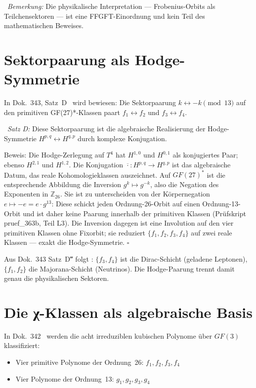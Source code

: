 \SM\ \textit{Bemerkung:} Die physikalische Interpretation — Frobenius-Orbits
als Teilchensektoren — ist eine FFGFT-Einordnung und kein Teil des
mathematischen Beweises.

\section{Sektorpaarung als Hodge-Symmetrie}

In Dok.~343, Satz~D \BM\ wird bewiesen: Die Sektorpaarung
$k \leftrightarrow -k \pmod{13}$ auf den primitiven GF(27)*-Klassen paart
$f_1 \leftrightarrow f_2$ und $f_3 \leftrightarrow f_4$.

\BM\ \textit{Satz D:} Diese Sektorpaarung ist die algebraische Realisierung
der Hodge-Symmetrie $H^{p,q} \leftrightarrow H^{q,p}$ durch komplexe
Konjugation.

Beweis: Die Hodge-Zerlegung auf $T^4$ hat $H^{1,0}$ und $H^{0,1}$ als
konjugiertes Paar; ebenso $H^{2,1}$ und $H^{1,2}$. Die Konjugation
$\overline{\cdot}: H^{p,q} \to H^{q,p}$ ist das algebraische Datum, das
reale Kohomologieklassen auszeichnet. Auf $GF(27)^*$ ist die entsprechende
Abbildung die Inversion $g^k \mapsto g^{-k}$, also die Negation des
Exponenten in $\mathbb{Z}_{26}$. Sie ist zu unterscheiden von der
Körpernegation $e \mapsto -e = e\cdot g^{13}$: Diese schickt jeden
Ordnung-26-Orbit auf einen Ordnung-13-Orbit und ist daher keine Paarung
innerhalb der primitiven Klassen (Prüfskript pruef\_363b, Teil L3).
Die Inversion dagegen ist eine Involution auf den vier primitiven
Klassen ohne Fixorbit; sie reduziert $\{f_1,f_2,f_3,f_4\}$ auf zwei
reale Klassen — exakt die Hodge-Symmetrie. \hfill$\square$

Aus Dok.~343 Satz~D‴ folgt \BM: $\{f_3,f_4\}$ ist die Dirac-Schicht
(geladene Leptonen), $\{f_1,f_2\}$ die Majorana-Schicht (Neutrinos). Die
Hodge-Paarung trennt damit genau die physikalischen Sektoren.

\section{Die χ-Klassen als algebraische Basis}

In Dok.~342 \BM\ werden die acht irreduziblen kubischen Polynome über
$GF(3)$ klassifiziert:
\begin{itemize}
\item Vier primitive Polynome der Ordnung~26: $f_1, f_2, f_3, f_4$
\item Vier Polynome der Ordnung~13: $g_1, g_2, g_3, g_4$
\end{itemize}

